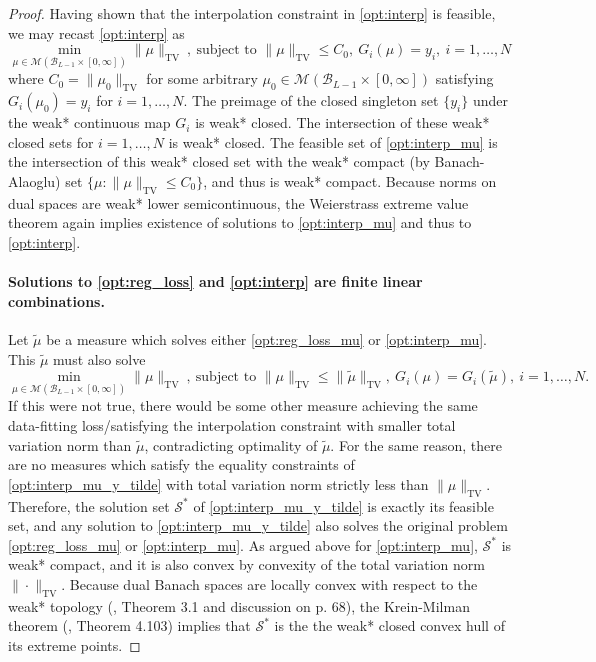 \documentclass{article}
\DeclareMathOperator{\TV}{TV}
\def\cB{{\mathcal{B}}}
\def\cM{{\mathcal{M}}}
\def\cS{{\mathcal{S}}}
\begin{document}
\begin{appendices}
\begin{proof}
    Having shown that the interpolation constraint in \eqref{opt:interp} is feasible, we may recast \eqref{opt:interp} as
    \begin{equation} \label{opt:interp_mu}
     \min_{\mu \in \cM(\cB_{L-1} \times [0,\infty])}  \| \mu \|_{\TV} \ , \ \mbox{subject to } \| \mu \|_{\TV} \leq C_0, \  G_i(\mu) = y_i, \  i = 1, \dots, N
    \end{equation}
    where $C_0 = \| \mu_0 \|_{\TV}$ for some arbitrary $\mu_0 \in \cM(\cB_{L-1} \times [0,\infty])$ satisfying $G_i(\mu_0) = y_i$ for $i = 1, \dots, N$. The preimage of the closed singleton set $\{ y_i \}$ under the weak* continuous map $G_i$ is weak* closed. The intersection of these weak* closed sets for $i = 1, \dots, N$ is weak* closed. The feasible set of \eqref{opt:interp_mu} is the intersection of this weak* closed set with the weak* compact (by Banach-Alaoglu) set $\{ \mu: \| \mu \|_{\TV} \leq C_0 \}$, and thus is weak* compact. Because norms on dual spaces are weak* lower semicontinuous, the Weierstrass extreme value theorem again implies existence of solutions to \eqref{opt:interp_mu} and thus to \eqref{opt:interp}.
    
    \paragraph{Solutions to \eqref{opt:reg_loss} and \eqref{opt:interp} are finite linear combinations.} Let $\tilde{\mu}$ be a measure which solves either \eqref{opt:reg_loss_mu} or \eqref{opt:interp_mu}. This $\tilde{\mu}$ must also solve
    \begin{equation} \label{opt:interp_mu_y_tilde}
     \min_{\mu \in \cM(\cB_{L-1} \times [0,\infty])}  \| \mu \|_{\TV} \ , \ \mbox{subject to } \| \mu \|_{\TV} \leq \| \tilde{\mu} \|_{\TV}, \   G_i(\mu) = G_i(\tilde{\mu}), \  i = 1, \dots, N.
    \end{equation}
    If this were not true, there would be some other measure achieving the same data-fitting loss/satisfying the interpolation constraint with smaller total variation norm than $\tilde{\mu}$, contradicting optimality of $\tilde{\mu}$. For the same reason, there are no measures which satisfy the equality constraints of \eqref{opt:interp_mu_y_tilde} with total variation norm strictly less than $\| \mu \|_{\TV}$. Therefore, the solution set $\cS^*$ of \eqref{opt:interp_mu_y_tilde} is exactly its feasible set, and any solution to \eqref{opt:interp_mu_y_tilde} also solves the original problem \eqref{opt:reg_loss_mu} or \eqref{opt:interp_mu}. As argued above for \eqref{opt:interp_mu}, $\cS^*$ is weak* compact, and it is also convex by convexity of the total variation norm $\| \cdot \|_{\TV}$. Because dual Banach spaces are locally convex with respect to the weak* topology (\cite{rudin1991functional}, Theorem 3.1 and discussion on p. 68), the Krein-Milman theorem (\cite{aliprantis2006infinite}, Theorem 4.103) implies that $\cS^*$ is the the weak* closed convex hull of its extreme points.


\end{proof}
\end{appendices}
\end{document}
